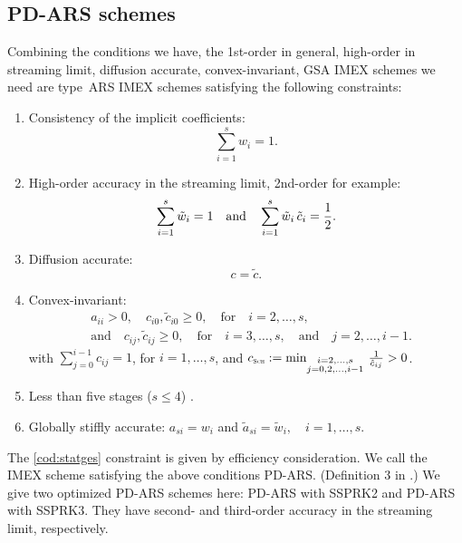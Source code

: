 \subsection{PD-ARS schemes}

Combining the conditions we have, the 1st-order in general, high-order in streaming limit, diffusion accurate, convex-invariant, GSA IMEX schemes we need are type~ARS IMEX schemes satisfying the following constraints:
\begin{enumerate}
    \item Consistency of the implicit coefficients:
    \begin{equation}
      \sum_{i=1}^{s}w_{i}=1.
    \end{equation}
    \item High-order accuracy in the streaming limit, 2nd-order for example:
    \begin{equation}
      \sum_{i=1}^{s}\tilde{w}_{i}=1
      \quad\text{and}\quad
      \sum_{i=1}^{s}\tilde{w}_{i}\,\tilde{c}_{i}=\frac{1}{2}.
      \label{eq:orderConditionsEx}
    \end{equation}
    \item Diffusion accurate:
    \begin{equation}
      c=\tilde{c}.
      \label{eq:diffusionCondition}
    \end{equation}
    \item Convex-invariant:
    \begin{align}
      &a_{ii}>0, \quad c_{i0},\tilde{c}_{i0}\ge0, \quad \text{for} \quad i=2,\ldots,s, \nonumber \\
      &\text{and} \quad c_{ij},\tilde{c}_{ij}\ge0, \quad \text{for} \quad i=3,\ldots,s, \quad\text{and}\quad j=2,\ldots,i-1.  
      \label{eq:convexInvariant}
    \end{align}
    with $\sum_{j=0}^{i-1}c_{ij}=1$, for $i=1,\ldots,s$, and $c_{\textnormal{\tiny\textsc{Sch}}}:=\min_{\substack{i = 2,\ldots,s \\ 
                  j = 0,2,\ldots,i-1}}\,\frac{1}{\hat{c}_{ij}}>0$.
    \item Less than five stages ($s\le4$) \label{cod:statges}.
    \item Globally stiffly accurate: $a_{si}=w_{i}$ and $\tilde{a}_{si}=\tilde{w}_{i},\quad i=1,\ldots,s$. 
\end{enumerate}  
The \ref{cod:statges} constraint is given by efficiency consideration.
We call the IMEX scheme satisfying the above conditions {PD-ARS}. (Definition 3 in \cite{chu_etal_2018}.)
We give two optimized PD-ARS schemes here: PD-ARS with SSPRK2 and  PD-ARS with SSPRK3. 
They have second- and third-order accuracy in the streaming limit, respectively.
